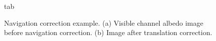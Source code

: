 \begin{figure}
  \begin{center}
    \caption[Navigation Correction tab]{
        tab
    }
    \label{navigation_tab}
  \end{center}
\end{figure}

\begin{figure}
  \begin{center}
    \caption[Navigation correction example]{
       Navigation correction example.  (a) Visible channel albedo
       image before navigation correction.  (b) Image after
       translation correction.
    }
    \label{correction}
  \end{center}
\end{figure}

